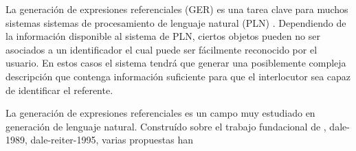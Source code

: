 La generación de expresiones referenciales (GER) es una tarea clave para muchos sistemas sistemas de procesamiento de lenguaje natural (PLN) \cite{reiter-dale-2000}. Dependiendo de la información disponible al sistema de PLN, ciertos objetos pueden no ser asociados a un  identificador el cual puede ser fácilmente reconocido por el usuario. En estos casos el sistema    tendrá que generar una posiblemente compleja descripción que contenga información suficiente para que el interlocutor sea capaz de identificar el referente.

La generación de expresiones referenciales es un campo muy estudiado en generación de lenguaje natural. Construído sobre el trabajo fundacional de \cite{winograd-1972}, dale-1989, dale-reiter-1995, varias propuestas han


